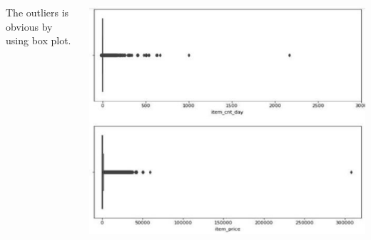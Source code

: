 \documentclass{tikzposter} %
\begin{document}
\begin{columns}
{\begin{description}
    \item 
    The outliers is obvious by using box plot.
\end{description}
\begin{tikzfigure}%
  \includegraphics[width=0.5\linewidth]{figures/Figure2.eps}
 \end{tikzfigure}
}
\end{columns}
\end{document}
